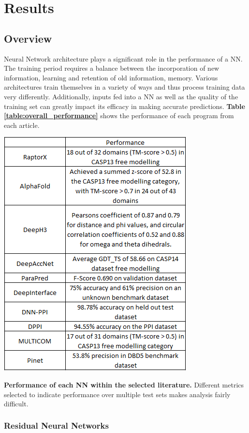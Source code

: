 \chapter{Results} 
\section{Overview}

Neural Network architecture plays a significant role in the performance of a NN. The training period requires a balance between the incorporation of new information, learning and retention of old information, memory. Various architectures train themselves in a variety of ways and thus process training data very differently. Additionally, inputs fed into a NN as well as the quality of the training set can greatly impact its efficacy in making accurate predictions. \textbf{Table \ref{table:overall_performance}} shows the performance of each program from each article.

\begin{table}[h!]
    \centering
    \includegraphics[width=0.6\linewidth]{./images/overall_performance.png}
    \caption{\textbf{Performance of each NN within the selected literature.} Different metrics selected to indicate performance over multiple test sets makes analysis fairly difficult.}
    \label{table:overall_performance}
\end{table}

\subsection{Residual Neural Networks}

